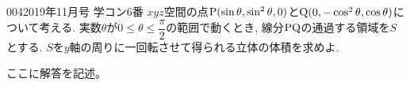 \begin{prob}{004}{}{2019年11月号 学コン6番}
 $xyz$空間の点${\rm P}(\sin{\theta}, \sin^2{\theta}, 0)$と${\rm Q}(0,-\cos^2{\theta}, \cos{\theta})$について考える. 実数$\theta$が$0\leq \theta\leq \dfrac{\pi}{2}$の範囲で動くとき, 線分${\rm PQ}$の通過する領域を$S$とする. $S$を$y$軸の周りに一回転させて得られる立体の体積を求めよ.
\end{prob}

ここに解答を記述。

